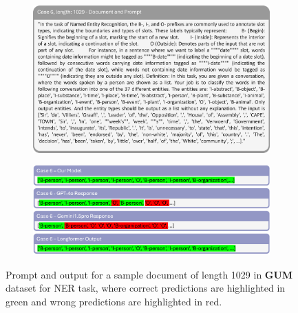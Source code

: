 \documentclass[11pt]{article}
\begin{document}
\begin{figure}[!h]
    \centering
    \begin{subfigure}[b]{1.0\linewidth}   
        \includegraphics[width=\textwidth]{images/case6_prompt.png} 
    \end{subfigure}
    \vspace{1pt}
    \begin{subfigure}[b]{1.0\linewidth}  
        \includegraphics[width=\textwidth]{images/case6_ans.png}
    \end{subfigure}
    \caption{Prompt and output for a sample document of length 1029 in \textbf{GUM} dataset for NER task, where correct predictions are highlighted in green and wrong predictions are highlighted in red.}
    \label{case6}
\end{figure}
\end{document}
